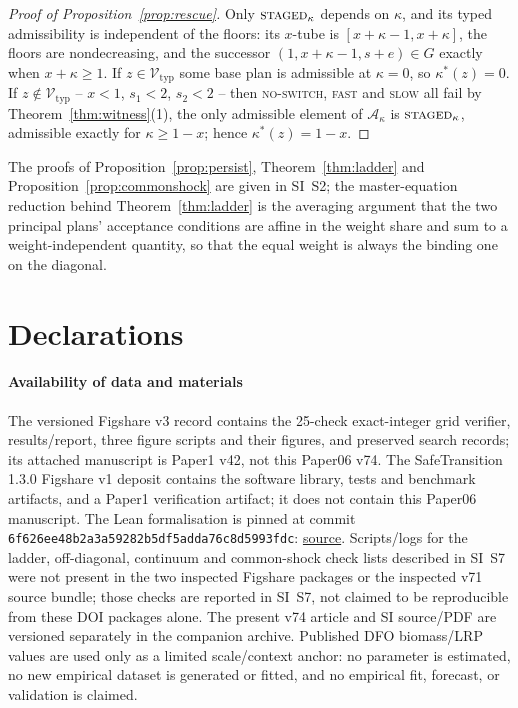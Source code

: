 \documentclass[preprint,11pt,authoryear]{elsarticle}
\theoremstyle{definition}
\theoremstyle{remark}
\newcommand{\Vtyp}{\mathcal{V}_{\mathrm{typ}}}
\newcommand{\act}[1]{\textsc{#1}}
\begin{document}
\begin{proof}[Proof of Proposition~\ref{prop:rescue}]
Only $\act{staged}_\kappa$ depends on $\kappa$, and its typed admissibility is independent of the floors: its $x$-tube is $[x+\kappa-1,x+\kappa]$, the floors are nondecreasing, and the successor $(1,x+\kappa-1,s+e)\in G$ exactly when $x+\kappa\ge1$. If $z\in\Vtyp$ some base plan is admissible at $\kappa=0$, so $\kappa^*(z)=0$. If $z\notin\Vtyp$ -- $x<1$, $s_1<2$, $s_2<2$ -- then \act{no-switch}, \act{fast} and \act{slow} all fail by Theorem~\ref{thm:witness}(1), the only admissible element of $\mathcal A_\kappa$ is $\act{staged}_\kappa$, admissible exactly for $\kappa\ge1-x$; hence $\kappa^*(z)=1-x$.
\end{proof}

\noindent The proofs of Proposition~\ref{prop:persist}, Theorem~\ref{thm:ladder} and Proposition~\ref{prop:commonshock} are given in SI~S2; the master-equation reduction behind Theorem~\ref{thm:ladder} is the averaging argument that the two principal plans' acceptance conditions are affine in the weight share and sum to a weight-independent quantity, so that the equal weight is always the binding one on the diagonal.

\section*{Declarations}
\paragraph{Availability of data and materials} The versioned Figshare v3 record \citep{Abaee2026code} contains the 25-check exact-integer grid verifier, results/report, three figure scripts and their figures, and preserved search records; its attached manuscript is Paper1 v42, not this Paper06 v74. The SafeTransition 1.3.0 Figshare v1 deposit \citep{Abaee2026software} contains the software library, tests and benchmark artifacts, and a Paper1 verification artifact; it does not contain this Paper06 manuscript. The Lean formalisation is pinned at commit \texttt{6f626ee48b2a3a59282b5df5adda76c8d5993fdc}: \href{https://github.com/MIKEAA2020/general-sustainability/blob/6f626ee48b2a3a59282b5df5adda76c8d5993fdc/lean/Formalizations/P1_AssessmentSeparation.lean}{source}. Scripts/logs for the ladder, off-diagonal, continuum and common-shock check lists described in SI~S7 were not present in the two inspected Figshare packages or the inspected v71 source bundle; those checks are reported in SI~S7, not claimed to be reproducible from these DOI packages alone. The present v74 article and SI source/PDF are versioned separately in the companion archive. Published DFO biomass/LRP values are used only as a limited scale/context anchor: no parameter is estimated, no new empirical dataset is generated or fitted, and no empirical fit, forecast, or validation is claimed.
\end{document}
